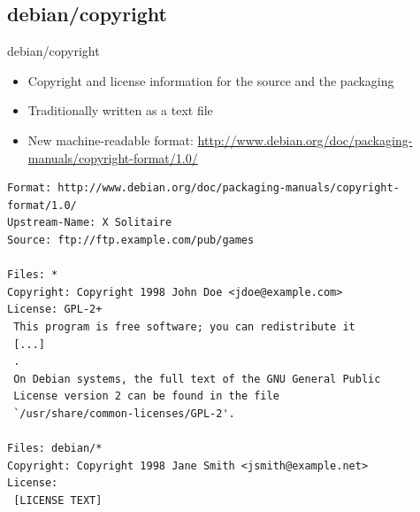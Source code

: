 \documentclass[10pt,final]{beamer}
\begin{document}
\subsection{debian/copyright}
\begin{frame}[fragile]{debian/copyright}
  \hbr
  \begin{itemize}
  \item Copyright and license information for the source and the packaging
  \item Traditionally written as a text file
  \item New machine-readable format:
    {\small\url{http://www.debian.org/doc/packaging-manuals/copyright-format/1.0/}}
  \end{itemize}
  \seprule
  \begin{lstlisting}[basicstyle=\ttfamily\scriptsize]
Format: http://www.debian.org/doc/packaging-manuals/copyright-format/1.0/
Upstream-Name: X Solitaire
Source: ftp://ftp.example.com/pub/games

Files: *
Copyright: Copyright 1998 John Doe <jdoe@example.com>
License: GPL-2+
 This program is free software; you can redistribute it
 [...]
 .
 On Debian systems, the full text of the GNU General Public
 License version 2 can be found in the file
 `/usr/share/common-licenses/GPL-2'.

Files: debian/*
Copyright: Copyright 1998 Jane Smith <jsmith@example.net>
License:
 [LICENSE TEXT]
\end{lstlisting}
\end{frame}
\end{document}
